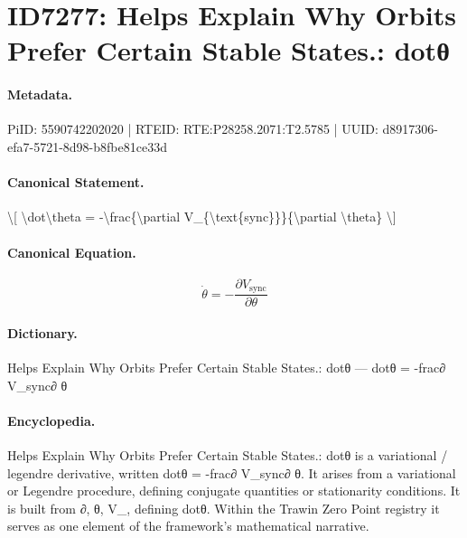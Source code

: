 \section*{ID7277: Helps Explain Why Orbits Prefer Certain Stable States.: dotθ}
\paragraph{Metadata.}
PiID: 5590742202020 | RTEID: RTE:P28258.2071:T2.5785 | UUID: d8917306-efa7-5721-8d98-b8fbe81ce33d

\paragraph{Canonical Statement.}
\textbackslash{}[ \textbackslash{}dot\textbackslash{}theta = -\textbackslash{}frac\{\textbackslash{}partial V\_\{\textbackslash{}text\{sync\}\}\}\{\textbackslash{}partial \textbackslash{}theta\} \textbackslash{}]

\paragraph{Canonical Equation.}
\[
\dot\theta = -\frac{\partial V_{\text{sync}}}{\partial \theta}
\]

\paragraph{Dictionary.}
Helps Explain Why Orbits Prefer Certain Stable States.: dotθ — dotθ = -frac∂ V\_sync∂ θ

\paragraph{Encyclopedia.}
Helps Explain Why Orbits Prefer Certain Stable States.: dotθ is a variational / legendre derivative, written dotθ = -frac∂ V\_sync∂ θ. It arises from a variational or Legendre procedure, defining conjugate quantities or stationarity conditions. It is built from ∂, θ, V\_, defining dotθ. Within the Trawin Zero Point registry it serves as one element of the framework's mathematical narrative.
